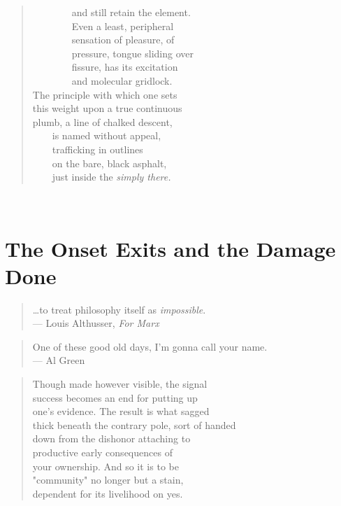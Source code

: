 \documentclass[
]{memoir}
\begin{document}
\begin{verse}
        and still retain the element.\\
        Even a least, peripheral\\
        sensation of pleasure, of\\
        pressure, tongue sliding over\\
        fissure, has its excitation\\
        and molecular gridlock.\\
The principle with which one sets\\
this weight upon a true continuous\\
plumb, a line of chalked descent,\\
    is named without appeal,\\
    trafficking in outlines\\
    on the bare, black asphalt,\\
    just inside the \emph{simply there.}\\
\end{verse}

~

\hypertarget{the-onset-exits-and-the-damage-done}{%
\section*{The Onset Exits and the Damage
Done}\label{the-onset-exits-and-the-damage-done}}

\begin{verse}
…to treat philosophy itself as \emph{impossible}.\\
— Louis Althusser, \emph{For Marx}\\
\end{verse}

\begin{verse}
One of these good old days, I’m gonna call your name.\\
— Al Green\\
\end{verse}

\begin{verse}
Though made however visible, the signal\\
success becomes an end for putting up\\
one's evidence. The result is what sagged\\
thick beneath the contrary pole, sort of handed\\
down from the dishonor attaching to\\
productive early consequences of\\
your ownership. And so it is to be\\
"community" no longer but a stain,\\
dependent for its livelihood on yes.\\
\end{verse}
\end{document}
